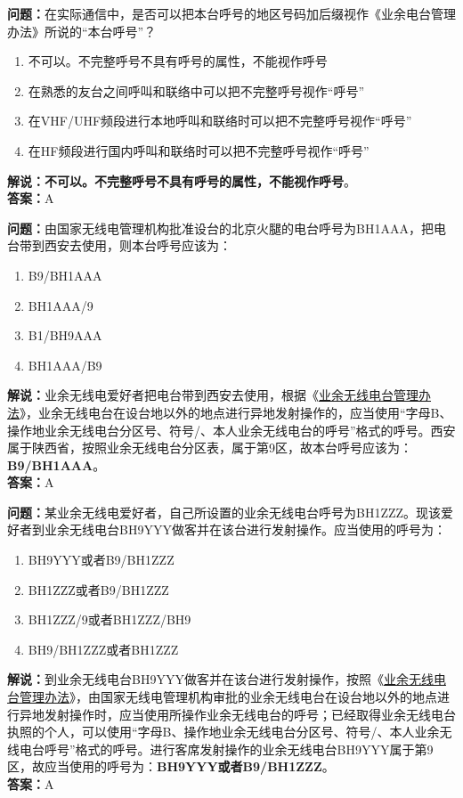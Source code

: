 \textbf{问题：}在实际通信中，是否可以把本台呼号的地区号码加后缀视作《业余电台管理办法》所说的“本台呼号”？
\begin{enumerate}[label=\Alph*), leftmargin=1.5cm]
	\item 不可以。不完整呼号不具有呼号的属性，不能视作呼号
	\item 在熟悉的友台之间呼叫和联络中可以把不完整呼号视作“呼号”
	\item 在VHF/UHF频段进行本地呼叫和联络时可以把不完整呼号视作“呼号”
	\item 在HF频段进行国内呼叫和联络时可以把不完整呼号视作“呼号”
\end{enumerate}
\textbf{解说：不可以。不完整呼号不具有呼号的属性，不能视作呼号}。\\\textbf{答案：}A%

\textbf{问题：}由国家无线电管理机构批准设台的北京火腿的电台呼号为BH1AAA，把电台带到西安去使用，则本台呼号应该为：
\begin{enumerate}[label=\Alph*), leftmargin=1.5cm]
	\item B9/BH1AAA
	\item BH1AAA/9
	\item B1/BH9AAA
	\item BH1AAA/B9
\end{enumerate}
\textbf{解说：}业余无线电爱好者把电台带到西安去使用，根据《\href{https://www.miit.gov.cn/jgsj/zfs/bmgz/art/2020/art_147b69815b3641caad9047735f94c860.html}{业余无线电台管理办法}》，业余无线电台在设台地以外的地点进行异地发射操作的，应当使用“字母B、操作地业余无线电台分区号、符号/、本人业余无线电台的呼号”格式的呼号。西安属于陕西省，按照业余无线电台分区表，属于第9区，故本台呼号应该为：\textbf{B9/BH1AAA}。\\\textbf{答案：}A

\textbf{问题：}某业余无线电爱好者，自己所设置的业余无线电台呼号为BH1ZZZ。现该爱好者到业余无线电台BH9YYY做客并在该台进行发射操作。应当使用的呼号为：
\begin{enumerate}[label=\Alph*), leftmargin=1.5cm]
	\item BH9YYY或者B9/BH1ZZZ
	\item BH1ZZZ或者B9/BH1ZZZ
	\item BH1ZZZ/9或者BH1ZZZ/BH9
	\item BH9/BH1ZZZ或者BH1ZZZ
\end{enumerate}
\textbf{解说：}到业余无线电台BH9YYY做客并在该台进行发射操作，按照《\href{https://www.miit.gov.cn/jgsj/zfs/bmgz/art/2020/art_147b69815b3641caad9047735f94c860.html}{业余无线电台管理办法}》，由国家无线电管理机构审批的业余无线电台在设台地以外的地点进行异地发射操作时，应当使用所操作业余无线电台的呼号；已经取得业余无线电台执照的个人，可以使用“字母B、操作地业余无线电台分区号、符号/、本人业余无线电台呼号”格式的呼号。进行客席发射操作的业余无线电台BH9YYY属于第9区，故应当使用的呼号为：\textbf{BH9YYY或者B9/BH1ZZZ}。\\\textbf{答案：}A

